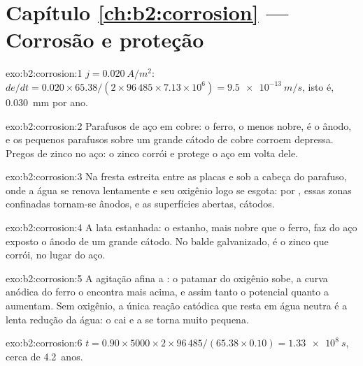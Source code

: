 \section*{Capítulo \ref{ch:b2:corrosion} --- Corrosão e proteção}

\begin{solution}{exo:b2:corrosion:1}
$j = \qty{0.020}{A/m^2}$: $de/dt = 0.020 \times 65.38/(2 \times 96\,485 \times 7.13
\times 10^6) = \qty{9.5e-13}{m/s}$, isto é, \qty{0.030}{mm} por ano.
\end{solution}

\begin{solution}{exo:b2:corrosion:2}
Parafusos de aço em cobre: o ferro, o menos nobre, é o ânodo, e os pequenos
parafusos sobre um grande cátodo de cobre corroem depressa. Pregos de zinco no
aço: o zinco corrói e protege o aço em volta dele.
\end{solution}

\begin{solution}{exo:b2:corrosion:3}
Na fresta estreita entre as placas e sob a cabeça do parafuso, onde a água se
renova lentamente e seu oxigênio logo se esgota: por ,
essas zonas confinadas tornam-se ânodos, e as superfícies abertas, cátodos.
\end{solution}

\begin{solution}{exo:b2:corrosion:4}
A lata estanhada: o estanho, mais nobre que o ferro, faz do aço exposto o
ânodo de um grande cátodo. No balde galvanizado, é o zinco que corrói, no
lugar do aço.
\end{solution}

\begin{solution}{exo:b2:corrosion:5}
A agitação afina a : o patamar do oxigênio sobe, a curva
anódica do ferro o encontra mais acima, e assim tanto o potencial quanto a
 aumentam. Sem oxigênio, a única reação catódica que resta
em água neutra é a lenta redução da água: o  cai e a
 se torna muito pequena.
\end{solution}

\begin{solution}{exo:b2:corrosion:6}
$t = 0.90 \times 5000 \times 2 \times 96\,485/(65.38 \times 0.10) = \qty{1.33e8}{s}$,
cerca de 4.2~anos.
\end{solution}

